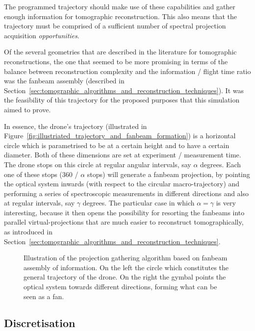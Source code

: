 The programmed trajectory should make use of these capabilities and
gather enough information for tomographic reconstruction. This also
means that the trajectory must be comprised of a sufficient number of
spectral projection acquisition \emph{opportunities}.

Of the several geometries that are described in the literature for
tomographic reconstructions, the one that seemed to be more promising in
terms of the balance between reconstruction complexity and the
information / flight time ratio was the fanbeam assembly (described in
Section~\ref{sec:tomographic_algorithms_and_reconstruction_techniques}).
It was the feasibility of this trajectory for the proposed purposes that
this simulation aimed to prove.

In essence, the drone's trajectory (illustrated in
Figure~\ref{fig:illustriated_trajectory_and_fanbeam_formation}) is a
horizontal circle which is parametrised to be at a certain height and to
have a certain diameter.  Both of these dimensions are set at experiment
/ measurement time. The drone stops on this circle at regular angular
intervals, say $\alpha$ degrees. Each one of these stops (360 / $\alpha$
stops) will generate a fanbeam projection, by pointing the optical
system inwards (with respect to the circular macro-trajectory) and
performing a series of spectroscopic measurements in different
directions and also at regular intervals, say $\gamma$ degrees. The
particular case in which $\alpha = \gamma$ is very interesting, because
it then opens the possibility for resorting the fanbeams into parallel
virtual-projections that are much easier to reconstruct tomographically,
as introduced in
Section~\ref{sec:tomographic_algorithms_and_reconstruction_techniques}.  

\begin{figure}[htpb]
    \centering
    \missingfigure{}
    \caption{Illustration of the projection gathering algorithm based on
    fanbeam assembly of information. On the left the circle which
    constitutes the general trajectory of the drone. On the right the
    gymbal points the optical system towards different directions, forming
    what can be seen as a fan.}
    \label{fig:illustrated_trajectory_and_fanbeam_formation}
\end{figure}

\subsection{Discretisation}%
\label{sub:discretisation}

